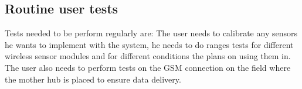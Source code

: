 \subsection{Routine user tests}
Tests needed to be perform regularly are: The user needs to calibrate any sensors he wants to implement with the system, he needs to do ranges tests for different wireless sensor modules and for different conditions the plans on using them in. The user also needs to perform tests on the GSM connection on the field where the mother hub is placed to ensure data delivery.

